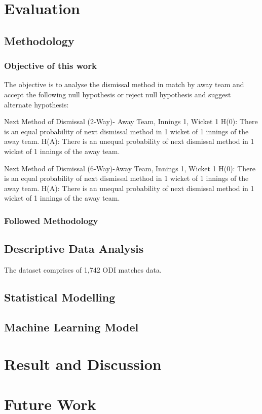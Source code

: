 \documentclass[fleqn,10pt]{wlscirep}
\begin{document}
\section{Evaluation}
\subsection{Methodology}
\subsubsection{Objective of this work}
The objective is to analyse the dismissal method in match by away team and accept the following null hypothesis or reject null hypothesis and suggest alternate hypothesis:

Next Method of Dismissal (2-Way)- Away Team, Innings 1, Wicket 1
H(0): There is an equal probability of next dismissal method in 1 wicket of 1 innings of the away team.
H(A): There is an unequal probability of next dismissal method in 1 wicket of 1 innings of the away team.

Next Method of Dismissal (6-Way)-Away Team, Innings 1, Wicket 1
H(0): There is an equal probability of next dismissal method in 1 wicket of 1 innings of the away team.
H(A): There is an unequal probability of next dismissal method in 1 wicket of 1 innings of the away team.
\subsubsection{Followed Methodology}

\subsection{Descriptive Data Analysis}
The dataset comprises of 1,742 ODI matches data.
\subsection{Statistical Modelling}
\subsection{Machine Learning Model}
\section{Result and Discussion}
\section{Future Work}
\appendix
\end{document}
